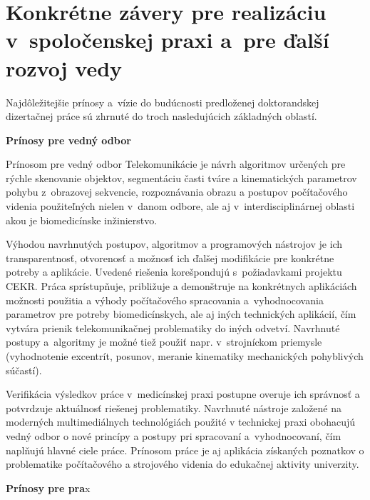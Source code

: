 \chapter{Konkrétne závery pre realizáciu v spoločenskej praxi a pre ďalší rozvoj vedy}

\pagestyle{fancy}
\fancyhf{}
\fancyfoot[CE,CO]{\thepage}



Najdôležitejšie prínosy a vízie do budúcnosti predloženej doktorandskej dizertačnej práce sú zhrnuté do troch nasledujúcich základných oblastí.

\textbf{Prínosy pre vedný odbor}

Prínosom pre vedný odbor Telekomunikácie je návrh algoritmov určených pre rýchle skenovanie objektov, segmentáciu časti tváre a   kinematických parametrov pohybu z obrazovej sekvencie, rozpoznávania obrazu a postupov počítačového videnia použiteľných nielen v danom odbore, ale aj v interdisciplinárnej oblasti akou je biomedicínske inžinierstvo. 

Výhodou navrhnutých postupov, algoritmov a programových nástrojov je ich transparentnosť, otvorenosť a možnosť ich ďalšej modifikácie pre konkrétne potreby a aplikácie. Uvedené riešenia korešpondujú s požiadavkami projektu CEKR. Práca sprístupňuje, približuje a demonštruje na konkrétnych aplikáciách možnosti použitia a výhody počítačového spracovania a vyhodnocovania parametrov pre potreby biomedicínskych, ale aj iných technických aplikácií, čím vytvára prienik telekomunikačnej problematiky do iných odvetví.  Navrhnuté postupy a algoritmy je možné tiež použiť napr. v strojníckom priemysle (vyhodnotenie excentrít, posunov, meranie kinematiky mechanických pohyblivých súčastí). 

Verifikácia výsledkov práce v medicínskej praxi postupne overuje ich správnosť a potvrdzuje aktuálnosť riešenej problematiky. Navrhnuté nástroje založené na moderných multimediálnych technológiách použité v technickej praxi obohacujú vedný odbor o nové princípy a postupy pri spracovaní a vyhodnocovaní, čím naplňujú hlavné ciele práce. Prínosom práce je aj aplikácia získaných poznatkov o problematike počítačového a strojového videnia do edukačnej aktivity univerzity. 

\textbf{Prínosy pre pra}x


